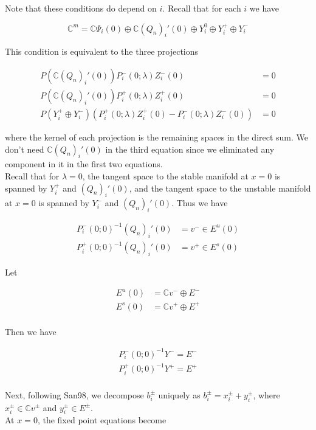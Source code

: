 \documentclass[12pt]{article}
\def\C{{\mathbb C}}
\begin{document}
Note that these conditions do depend on $i$. Recall that for each $i$ we have

\[
\C^m = \C \Psi_i(0) \oplus \C (Q_n)_i'(0) \oplus Y_i^0 \oplus Y_i^+ \oplus Y_i^- 
\]

This condition is equivalent to the three projections

\begin{align*}
P(\C (Q_n)_i'(0) ) P_i^-(0; \lambda) Z_i^-(0) &= 0 \\
P(\C (Q_n)_i'(0) ) P_i^+(0; \lambda) Z_i^+(0) &= 0 \\
P(Y_i^+ \oplus Y_i^-) ( P_i^+(0; \lambda) Z_i^+(0) - P_i^-(0; \lambda) Z_i^-(0) ) &= 0
\end{align*}

where the kernel of each projection is the remaining spaces in the direct sum. We don't need $\C (Q_n)_i'(0)$ in the third equation since we eliminated any component in it in the first two equations.\\

Recall that for $\lambda = 0$, the tangent space to the stable manifold at $x = 0$ is spanned by $Y_i^+$ and $(Q_n)_i'(0)$, and the tangent space to the unstable manifold at $x = 0$ is spanned by $Y_i^-$ and $(Q_n)_i'(0)$. Thus we have

\begin{align*}
P_i^-(0; 0)^{-1} (Q_n)_i'(0) &= v^- \in E^u(0) \\
P_i^+(0; 0)^{-1} (Q_n)_i'(0) &= v^+ \in E^s(0)
\end{align*}

Let

\begin{align*}
E^u(0) &= \C v^- \oplus E^- \\
E^s(0) &= \C v^+ \oplus E^+ \\
\end{align*}

Then we have

\begin{align*}
P_i^-(0; 0)^{-1} Y^- = E^- \\
P_i^+(0; 0)^{-1} Y^+ = E^+ \\
\end{align*}

Next, following San98, we decompose $b_i^\pm$ uniquely as $b_i^\pm = x_i^\pm + y_i^\pm$, where $x_i^\pm \in \C v^\pm$ and $y_i^\pm \in E^\pm$.\\

At $x = 0$, the fixed point equations become
\end{document}
